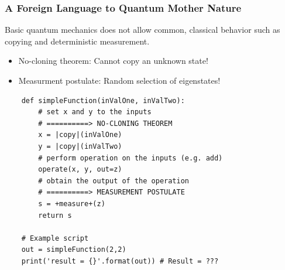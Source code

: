 \documentclass[handout]{beamer}
\begin{document}
\begin{frame}[fragile]
  \frametitle{A Foreign Language to Quantum Mother Nature}
  Basic quantum mechanics does not allow common, classical behavior such as
  copying and deterministic measurement.
  \begin{itemize}
  \item No-cloning theorem: Cannot copy an unknown state!
  \item Measurment postulate: Random selection of eigenstates!
  \end{itemize}
  
  \begin{lstlisting}
    def simpleFunction(inValOne, inValTwo):
        # set x and y to the inputs
        # ==========> NO-CLONING THEOREM
        x = |copy|(inValOne) 
        y = |copy|(inValTwo)
        # perform operation on the inputs (e.g. add)
        operate(x, y, out=z)
        # obtain the output of the operation
        # ==========> MEASUREMENT POSTULATE
        s = +measure+(z)
        return s

    # Example script
    out = simpleFunction(2,2)
    print('result = {}'.format(out)) # Result = ??? 
  \end{lstlisting}
  
\end{frame}
\end{document}
